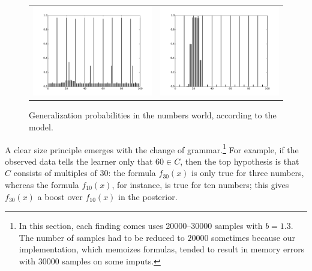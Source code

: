 \documentclass[apacite,jou]{apa6}
\begin{document}
\begin{figure}
\begin{tabular}{@{}p{}@{}p{}@{}}
	\includegraphics[scale=\Scale]{ng6080103023.pdf} &
	\includegraphics[scale=\Scale]{ng60801030232521.pdf}
	\end{tabular}
	\caption{Generalization probabilities in the numbers world, according to
	the model.}
	\label{numbersplot}
\end{figure}

A clear size principle emerges with the change of 
grammar.\footnote{In this section, each finding comes uses
20000--30000 samples with $b=1.3$. The number of samples had
to be reduced to $20000$ sometimes because our implementation,
which memoizes formulas, tended to result in memory errors
with $30000$ samples on some imputs.} For
example, if the observed data tells the learner only that $60\in C$,
then the top hypothesis is that $C$ consists of multiples of 30:
the formula $f_{30}(x)$ is only true for three numbers, whereas
the formula $f_{10}(x)$, for instance, is true for ten numbers;
this gives $f_{30}(x)$ a boost over $f_{10}(x)$ in the posterior.
\end{document}
